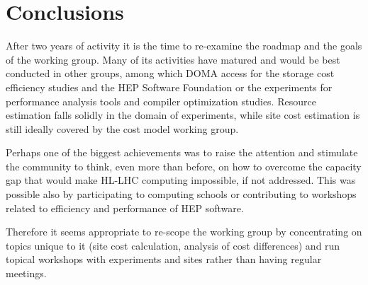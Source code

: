 \section{Conclusions}
After two years of activity it is the time to re-examine the roadmap
and the goals of the working group. Many of its activities have
matured and would be best conducted in other groups, among which DOMA
access for the storage cost efficiency studies and the HEP Software
Foundation or the experiments for performance analysis tools and
compiler optimization studies.  Resource estimation falls solidly in
the domain of experiments, while site cost estimation is still ideally
covered by the cost model working group.

Perhaps one of the biggest achievements was to raise the attention and
stimulate the community to think, even more than before, on how to
overcome the capacity gap that would make HL-LHC computing impossible,
if not addressed. This was possible also by participating to computing
schools or contributing to workshops related to efficiency and
performance of HEP software.

Therefore it seems appropriate to re-scope the working group by
concentrating on topics unique to it (site cost calculation, analysis
of cost differences) and run topical workshops with experiments and
sites rather than having regular meetings.
